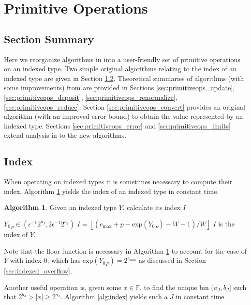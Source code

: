 \documentclass[12pt]{article}
\providecommand{\floor}[1]{\left \lfloor #1 \right \rfloor }
\providecommand{\F}{\ensuremath{\mathbb{F}}}
\providecommand{\exp}{\ensuremath{\text{exp}}}
\providecommand{\max}{\ensuremath{\text{max}}}
\theoremstyle{definition}
\newtheorem{alg}{Algorithm}[section]
\numberwithin{equation}{section}
\numberwithin{figure}{section}
\begin{document}
\section{Primitive Operations}
  \subsection{Section Summary}
    Here we reorganize algorithms in \cite{repsum} into a user-friendly set of primitive operations on an indexed type. Two simple original algorithms relating to the index of an indexed type are given in Section \ref{sec:primitiveops_index}. Theoretical summaries of algorithms (with some improvements) from \cite{repsum} are provided in Sections \ref{sec:primitiveops_update}, \ref{sec:primitiveops_deposit}, \ref{sec:primitiveops_renormalize}, \ref{sec:primitiveops_reduce}. Section \ref{sec:primitiveops_convert} provides an original algorithm (with an improved error bound) to obtain the value represented by an indexed type. Sections \ref{sec:primitiveops_error} and \ref{sec:primitiveops_limits} extend analysis in \cite{repsum} to the new algorithms.
  \subsection{Index}
    \label{sec:primitiveops_index}
    When operating on indexed types it is sometimes necessary to compute their index. Algorithm \ref{alg:iindex} yields the index of an indexed type in constant time.

    \begin{samepage}
    \begin{alg}
      Given an indexed type $Y$, calculate its index $I$
      \begin{algorithmic}[1]
        \Require
          \Statex ${Y_0}_P \in (\epsilon^{-1}  2^{a_{I}}, 2  \epsilon^{-1}  2^{a_I})$
          \State $I = \floor{(e_{\max} + p - \exp({Y_0}_P) - W + 1)/W}$
        \EndFunction
        \Ensure
          \Statex $I$ is the index of $Y$.
      \end{algorithmic}
      \label{alg:iindex}
    \end{alg}
    \end{samepage}

    Note that the floor function is necessary in Algorithm \ref{alg:iindex} to account for the case of $Y$ with index $0$, which has $\exp({Y_0}_P) = 2^{e_{\max}}$ as discussed in Section \ref{sec:indexed_overflow}.

    Another useful operation is, given some $x \in \F$, to find the unique bin $(a_J, b_J]$ such that $2^{b_J} > |x| \geq 2^{a_J}$. Algorithm \ref{alg:index} yields such a $J$ in constant time.
\end{document}
